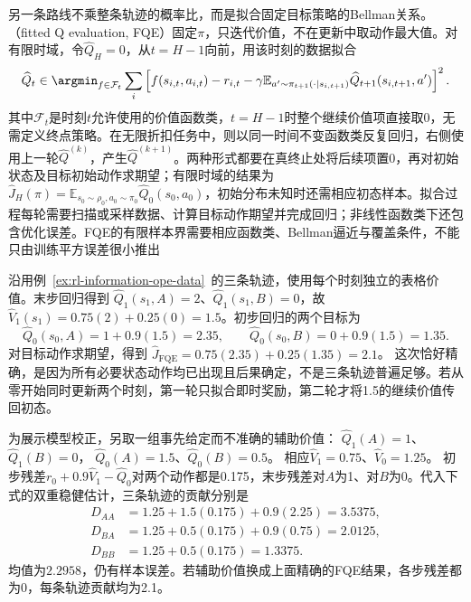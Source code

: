 另一条路线不乘整条轨迹的概率比，而是拟合固定目标策略的Bellman关系。（fitted Q evaluation, FQE）固定$\pi$，只迭代价值，不在更新中取动作最大值。对有限时域，令$\widehat Q_H=0$，从$t=H-1$向前，用该时刻的数据拟合
\begin{equation}
  \label{eq:rl-information-fqe}
  \widehat Q_t
  \in\argmin_{f\in\mathcal F_t}
    \sum_{i}
    \left[
      f(s_{i,t},a_{i,t})
      -r_{i,t}
      -\gamma\mathbb E_{a'\sim\pi_{t+1}(\cdot\mid s_{i,t+1})}
                       \widehat Q_{t+1}(s_{i,t+1},a')
    \right]^2.
\end{equation}
其中$\mathcal F_t$是时刻$t$允许使用的价值函数类，$t=H-1$时整个继续价值项直接取0，无需定义终点策略。在无限折扣任务中，则以同一时间不变函数类反复回归，右侧使用上一轮$\widehat Q^{(k)}$，产生$\widehat Q^{(k+1)}$。两种形式都要在真终止处将后续项置0，再对初始状态及目标初始动作求期望；有限时域的结果为$\widehat J_H(\pi)=\mathbb E_{s_0\sim\rho_0,a_0\sim\pi_0}\widehat Q_0(s_0,a_0)$，初始分布未知时还需相应初态样本。拟合过程每轮需要扫描或采样数据、计算目标动作期望并完成回归；非线性函数类下还包含优化误差。FQE的有限样本界需要相应函数类、Bellman逼近与覆盖条件，不能只由训练平方误差很小推出

\begin{example}[在同一日志上完成FQE与DR]
  \label{ex:rl-information-fqe-dr}
  沿用例~\ref{ex:rl-information-ope-data}~的三条轨迹，使用每个时刻独立的表格价值。末步回归得到
  $\widehat Q_1(s_1,A)=2$、$\widehat Q_1(s_1,B)=0$，故
  $\widehat V_1(s_1)=0.75(2)+0.25(0)=1.5$。初步回归的两个目标为
  \[
    \widehat Q_0(s_0,A)=1+0.9(1.5)=2.35,\qquad
    \widehat Q_0(s_0,B)=0+0.9(1.5)=1.35.
  \]
  对目标动作求期望，得到
  $\widehat J_{\mathrm{FQE}}=0.75(2.35)+0.25(1.35)=2.1$。
  这次恰好精确，是因为所有必要状态动作均已出现且后果确定，不是三条轨迹普遍足够。若从零开始同时更新两个时刻，第一轮只拟合即时奖励，第二轮才将1.5的继续价值传回初态。

  为展示模型校正，另取一组事先给定而不准确的辅助价值：
  $\widehat Q_1(A)=1$、$\widehat Q_1(B)=0$，
  $\widehat Q_0(A)=1.5$、$\widehat Q_0(B)=0.5$。
  相应$\widehat V_1=0.75$、$\widehat V_0=1.25$。
  初步残差$r_0+0.9\widehat V_1-\widehat Q_0$对两个动作都是0.175，末步残差对$A$为1、对$B$为0。代入下式的双重稳健估计，三条轨迹的贡献分别是
  \[
  \begin{aligned}
    D_{AA}&=1.25+1.5(0.175)+0.9(2.25)=3.5375,\\
    D_{BA}&=1.25+0.5(0.175)+0.9(0.75)=2.0125,\\
    D_{BB}&=1.25+0.5(0.175)=1.3375.
  \end{aligned}
  \]
  均值为$2.2958$，仍有样本误差。若辅助价值换成上面精确的FQE结果，各步残差都为0，每条轨迹贡献均为2.1。
\end{example}

